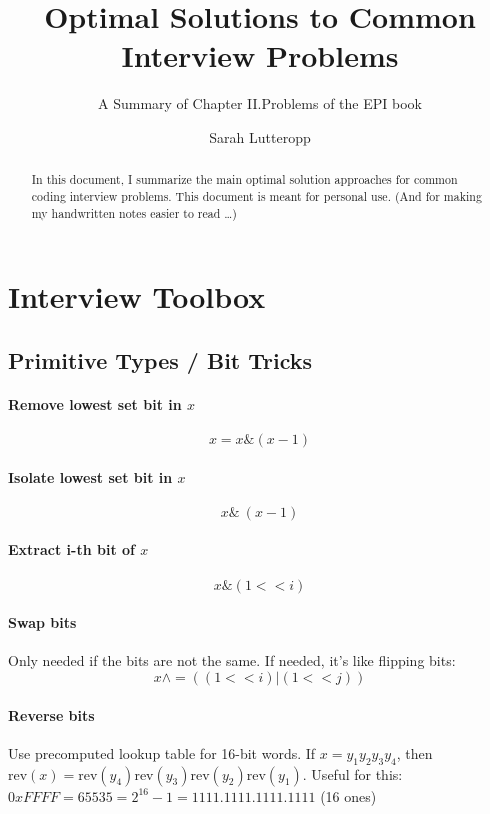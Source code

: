 \documentclass[runningheads]{llncs}
\begin{document}
%
\title{Optimal Solutions to Common Interview Problems}
\subtitle{A Summary of Chapter II.Problems of the EPI book}

\author{Sarah Lutteropp}


\maketitle

\begin{abstract}

In this document, I summarize the main optimal solution approaches for common coding interview problems. This document is meant for personal use. (And for making my handwritten notes easier to read \ldots)

\end{abstract}

\section{Interview Toolbox}

\subsection{Primitive Types / Bit Tricks}

\paragraph{Remove lowest set bit in $x$}
$$x = x \& (x-1)$$

\paragraph{Isolate lowest set bit in $x$}
$$x \& ~(x-1)$$

\paragraph{Extract i-th bit of $x$}
$$x \& (1 << i)$$

\paragraph{Swap bits}
Only needed if the bits are not the same. If needed, it's like flipping bits:
$$x \wedge = ((1 << i) | (1 << j))$$

\paragraph{Reverse bits}
Use precomputed lookup table for 16-bit words.
If $x = y_1 y_2 y_3 y_4$, then $\text{rev}(x) = \text{rev}(y_4) \text{rev}(y_3) \text{rev}(y_2) \text{rev}(y_1) $.
Useful for this: $0xFFFF = 65535 = 2^{16}-1 = 1111.1111.1111.1111$ (16 ones)
\end{document}
